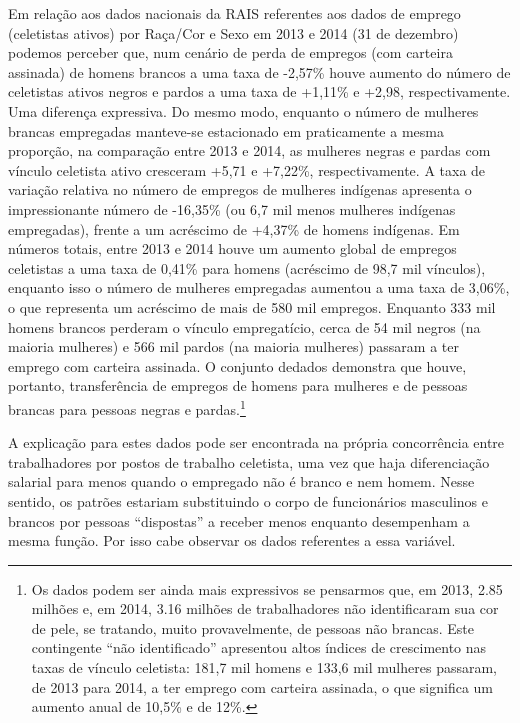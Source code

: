 Em relação aos dados nacionais da RAIS referentes aos dados de emprego
(celetistas ativos) por Raça/Cor e Sexo em 2013 e 2014 (31 de dezembro)
podemos perceber que, num cenário de perda de empregos (com carteira
assinada) de homens brancos a uma taxa de -2,57\% houve aumento do
número de celetistas ativos negros e pardos a uma taxa de +1,11\% e
+2,98, respectivamente. Uma diferença expressiva. Do mesmo modo,
enquanto o número de mulheres brancas empregadas manteve-se estacionado
em praticamente a mesma proporção, na comparação entre 2013 e 2014, as
mulheres negras e pardas com vínculo celetista ativo cresceram +5,71 e
+7,22\%, respectivamente. A taxa de variação relativa no número de
empregos de mulheres indígenas apresenta o impressionante número de
-16,35\% (ou 6,7 mil menos mulheres indígenas empregadas), frente a um
acréscimo de +4,37\% de homens indígenas. Em números totais, entre 2013
e 2014 houve um aumento global de empregos celetistas a uma taxa de
0,41\% para homens (acréscimo de 98,7 mil vínculos), enquanto isso o
número de mulheres empregadas aumentou a uma taxa de 3,06\%, o que
representa um acréscimo de mais de 580 mil empregos. Enquanto 333 mil
homens brancos perderam o vínculo empregatício, cerca de 54 mil negros
(na maioria mulheres) e 566 mil pardos (na maioria mulheres) passaram a
ter emprego com carteira assinada. O conjunto dedados demonstra que
houve, portanto, transferência de empregos de homens para mulheres e de
pessoas brancas para pessoas negras e pardas.\footnote{Os dados podem
  ser ainda mais expressivos se pensarmos que, em 2013, 2.85 milhões e,
  em 2014, 3.16 milhões de trabalhadores não identificaram sua cor de
  pele, se tratando, muito provavelmente, de pessoas não brancas. Este
  contingente ``não identificado'' apresentou altos índices de
  crescimento nas taxas de vínculo celetista: 181,7 mil homens e 133,6
  mil mulheres passaram, de 2013 para 2014, a ter emprego com carteira
  assinada, o que significa um aumento anual de 10,5\% e de 12\%.}

A explicação para estes dados pode ser encontrada na própria
concorrência entre trabalhadores por postos de trabalho celetista, uma
vez que haja diferenciação salarial para menos quando o empregado não é
branco e nem homem. Nesse sentido, os patrões estariam substituindo o
corpo de funcionários masculinos e brancos por pessoas ``dispostas'' a
receber menos enquanto desempenham a mesma função. Por isso cabe
observar os dados referentes a essa variável.

